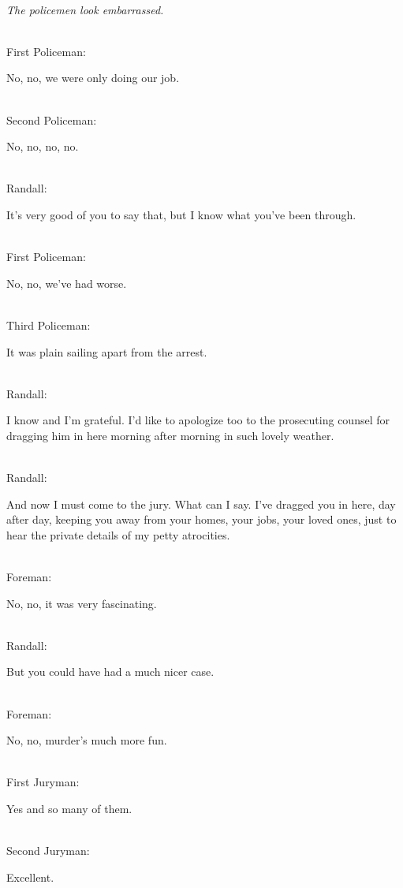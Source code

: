 \documentclass{report}
\begin{document}
\noindent\\\emph{The policemen look embarrassed.}

\noindent\\ First Policeman: 	

No, no, we were only doing our job.

\noindent\\ Second Policeman: 	

No, no, no, no.

\noindent\\ Randall: 	

It's very good of you to say that, but I know what you've been through.

\noindent\\ First Policeman:	

No, no, we've had worse.

\noindent\\ Third Policeman: 	

It was plain sailing apart from the arrest.

\noindent\\ Randall:

I know and I'm grateful. I'd like to apologize too to the prosecuting counsel for dragging him in here morning after morning in such lovely weather.



\noindent\\ Randall: 	

And now I must come to the jury. What can I say. I've dragged you in here, day after day, keeping you away from your homes, your jobs, your loved ones, just to hear the private details of my petty atrocities.

\noindent\\ Foreman: 	

No, no, it was very fascinating.

\noindent\\ Randall: 	

But you could have had a much nicer case.

\noindent\\ Foreman: 	

No, no, murder's much more fun.

\noindent\\ First Juryman: 	

Yes and so many of them.

\noindent\\ Second Juryman: 	

Excellent.
\end{document}
